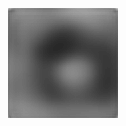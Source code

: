 \begin{figure}[H]
\begin{subfigure}[t]{0.15\textwidth}
  \end{subfigure}
  \begin{subfigure}[t]{0.15\textwidth}
    \centering
    \includegraphics[width=\linewidth]{img/ten-trials/prediction_1_cnnv4.png}
  \end{subfigure}
  \\
    \vspace{0.1cm}
  

\end{figure}
